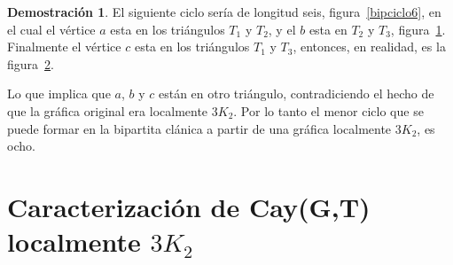 \documentclass[12pt]{book}
\theoremstyle{definition}
\newtheorem{demostration}{Demostración}
\begin{document}
\begin{demostration}
El siguiente ciclo sería de longitud seis, figura~\ref{bipciclo6}, en
el cual el vértice $a$ esta en los triángulos $T_1$ y $T_2$, y el $b$
esta en $T_2$ y $T_3$, figura~\ref{bipartitalong6}. Finalmente el
vértice $c$ esta en los triángulos $T_1$ y $T_3$, entonces, en
realidad, es la figura~\ref{triancontriang}.


\begin{figure}[htb]
  \centering
  \caption{}
  \label{bipartitalong6}
\end{figure}

\begin{figure}[htb]
  \centering
  \caption{} \label{triancontriang}
\end{figure}

Lo que implica que $a$, $b$ y $c$ están en otro triángulo,
contradiciendo el hecho de que la gráfica original era localmente
$3K_2$. Por lo tanto el menor ciclo que se puede formar en la
bipartita clánica a partir de una gráfica localmente $3K_2$, es ocho.
\end{demostration}



\newpage

\section {Caracterización de Cay(G,T) localmente $3K_2$}
\end{document}
